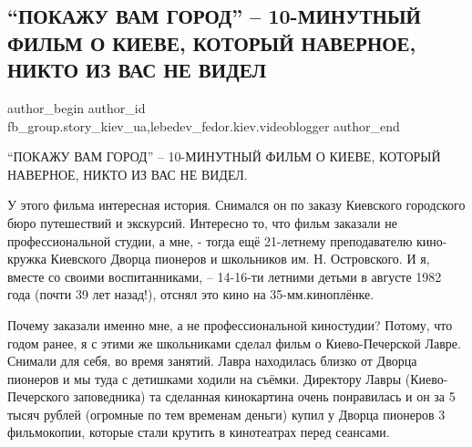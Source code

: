  
 
 
 
 
 
\subsection{\enquote{ПОКАЖУ ВАМ ГОРОД} – 10-МИНУТНЫЙ ФИЛЬМ О КИЕВЕ, КОТОРЫЙ НАВЕРНОЕ, НИКТО ИЗ ВАС НЕ ВИДЕЛ}
\label{sec:06_02_2021.fb.fb_group.story_kiev_ua.1.pokazhu_vam_gorod}
 
\ifcmt
 author_begin
   author_id fb_group.story_kiev_ua,lebedev_fedor.kiev.videoblogger
 author_end
\fi

\enquote{ПОКАЖУ ВАМ ГОРОД} – 10-МИНУТНЫЙ ФИЛЬМ О КИЕВЕ,  КОТОРЫЙ НАВЕРНОЕ, НИКТО ИЗ ВАС
НЕ ВИДЕЛ.

У этого фильма интересная история. Снимался он по заказу Киевского городского
бюро путешествий и экскурсий. Интересно то, что фильм заказали не
профессиональной студии, а мне, - тогда ещё 21-летнему преподавателю
кино-кружка Киевского Дворца пионеров и школьников им. Н. Островского. И я,
вместе со своими воспитанниками, – 14-16-ти летними детьми в августе 1982 года
(почти 39 лет назад!), отснял это кино на 35-мм.киноплёнке. 


Почему заказали именно мне, а не профессиональной киностудии? Потому, что годом
ранее, я с этими же школьниками сделал фильм о Киево-Печерской Лавре. Снимали
для себя, во время занятий. Лавра находилась близко от Дворца пионеров и мы
туда с детишками ходили на съёмки. Директору Лавры (Киево-Печерского
заповедника) та сделанная кинокартина очень понравилась и он за 5 тысяч рублей
(огромные по тем временам деньги) купил у Дворца пионеров 3 фильмокопии,
которые стали крутить в кинотеатрах перед сеансами.


